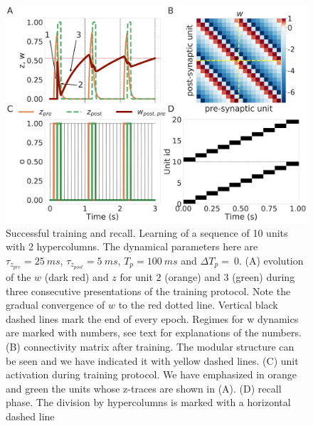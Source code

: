 \documentclass[10pt,a4paper]{article}
\begin{document}
\begin{figure}[H]
\centering
\includegraphics[scale=0.20]{recall_example.pdf}
\caption{Successful training and recall. Learning of a sequence of 10 units with 2 hypercolumns. The dynamical parameters here are $\tau_{z_{pre}} = 25 \: ms$, $\tau_{z_{post}}=5 \: ms$, $T_p=100 \: ms$ and $\Delta T_p = \: 0 $. (A) evolution of the $w$ (dark red) and $z$ for unit $2$ (orange) and $3$ (green) during three consecutive presentations of the training protocol. Note the gradual convergence of $w$ to the red dotted line. Vertical black dashed lines mark the end of every epoch. Regimes for w dynamics are marked with numbers, see text for explanations of the numbers. (B) connectivity matrix after training. The modular structure can be seen and we have indicated it with yellow dashed lines. (C) unit activation during training protocol. We have emphasized in orange and green the units whose z-traces are shown in (A). (D) recall phase. The division by hypercolumns is marked with a horizontal dashed line}
\label{fig:recall_example}
\end{figure}

\end{document}
